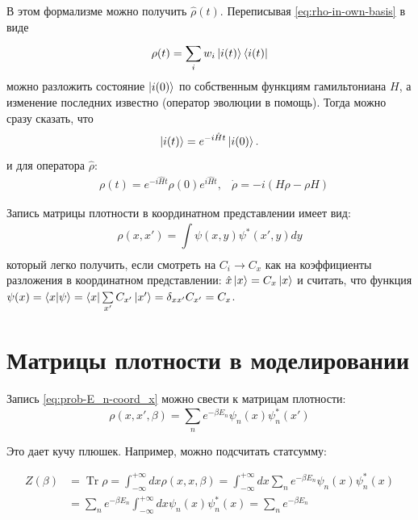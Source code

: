 \begin{lecture}
В этом формализме можно получить $\hat{\rho} (t)$.
Переписывая \eqref{eq:rho-in-own-basis} в виде
\begin{equation}
    \label{eq:rho-in-own-basis-time}
    \rho (t) = \sum\limits_{i}^{} w_i \ket{i(t)} \bra{i (t)}
\end{equation}
можно разложить состояние $\ket{i(0)}$ по собственным функциям гамильтониана $H$, а изменение последних известно (оператор эволюции в помощь).
Тогда можно сразу сказать, что
\begin{equation}
    \label{eq:i-th_state_time_evolution}
    \ket{i(t)} = e^{-i \hat{H}t} \ket{i(0)}.
\end{equation}
и для оператора $\hat{\rho}$:
\begin{align}
    \label{eq:rho-time-evolution}
    & \rho (t) = e^{-i \hat{H} t} \rho (0) e^{i \hat{H}t},
    & \dot \rho = -i (H\rho - \rho H)
\end{align}

Запись матрицы плотности в координатном представлении имеет вид:
\begin{equation}
    \rho (x, x') = \int\limits_{}^{} \psi (x, y) \psi^* (x', y) dy
\end{equation}
который легко получить, если смотреть на $C_i \rightarrow C_x$ как на коэффициенты разложения в координатном представлении: $\hat{x} \ket{x} = C_x \ket{x}$ и считать, что функция $\psi (x) = \braket{x|\psi} = \bra{x}\sum\limits_{x'}^{} C_{x'}\ket{x'} = \delta_{xx'} C_{x'} = C_x$.

\section{Матрицы плотности в моделировании}
Запись \eqref{eq:prob-E_n-coord_x} можно свести к матрицам плотности:
\begin{equation}
    \label{eq:rho-via-E_n-coord_x}
    \rho (x, x', \beta) = \sum\limits_{n}^{} e^{-\beta E_n} \psi_n (x) \psi_n^* (x')
\end{equation}

Это дает кучу плюшек. Например, можно подсчитать статсумму:

\begin{equation}
    \label{eq:Z-rho-is-correct}
    \begin{aligned} 
        Z(\beta) &=\operatorname{Tr} \rho=\int_{-\infty}^{+\infty} d x \rho(x, x, \beta) =\int_{-\infty}^{+\infty} d x \sum_{n} e^{-\beta E_{n}} \psi_{n}(x) \psi_{n}^{*}(x) \\ &=\sum_{n} e^{-\beta E_{n}} \int_{-\infty}^{+\infty} d x \psi_{n}(x) \psi_{n}^{*}(x) = \sum_{n} e^{-\beta E_{n}} 
    \end{aligned}
\end{equation}


\end{lecture}
